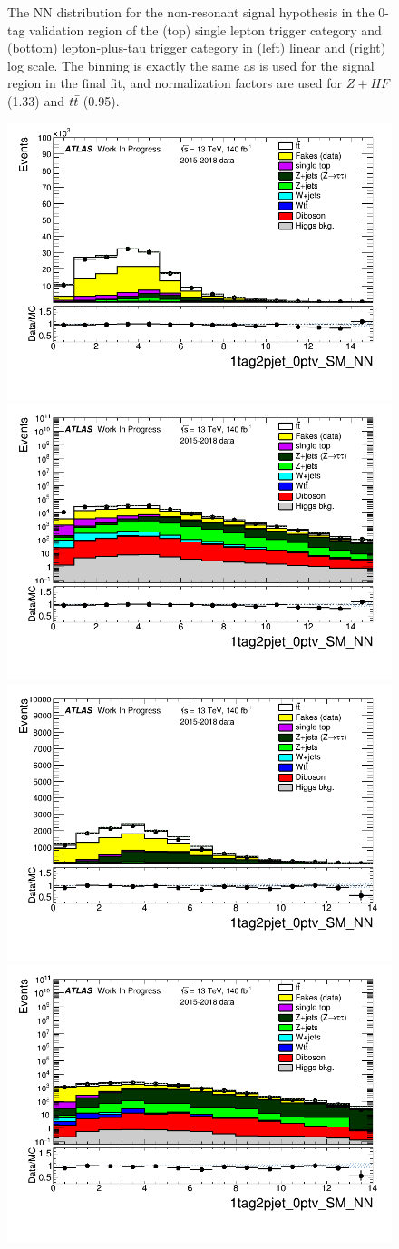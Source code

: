 \begin{figure}
\caption{The NN distribution for the non-resonant signal hypothesis in the $0$-tag validation region of the (top) single lepton trigger category and (bottom) lepton-plus-tau trigger category in (left) linear and (right) log scale. The binning is exactly the same as is used for the signal region in the final fit, and normalization factors are used for $Z+HF$ (1.33) and $t\bar{t}$ (0.95).}
\label{fig:SLT_LTT_0tag_SR}
\end{figure}

\begin{figure}
\centering
\includegraphics[width=.45\textwidth]{DiHiggs/plots/lephadFF/SLT/1tag2pjet_0ptv_SM_NN_SLT_ALLFAKES_Bulb_SRbinning_lin.png}
\includegraphics[width=.45\textwidth]{DiHiggs/plots/lephadFF/SLT/1tag2pjet_0ptv_SM_NN_SLT_ALLFAKES_Bulb_SRbinning_log.png}\\
\includegraphics[width=.45\textwidth]{DiHiggs/plots/lephadFF/LTT/1tag2pjet_0ptv_SM_NN_LTT_ALLFAKES_Bulb_SRbinning_lin.png}
\includegraphics[width=.45\textwidth]{DiHiggs/plots/lephadFF/LTT/1tag2pjet_0ptv_SM_NN_LTT_ALLFAKES_Bulb_SRbinning_log.png}\\

\end{figure}
